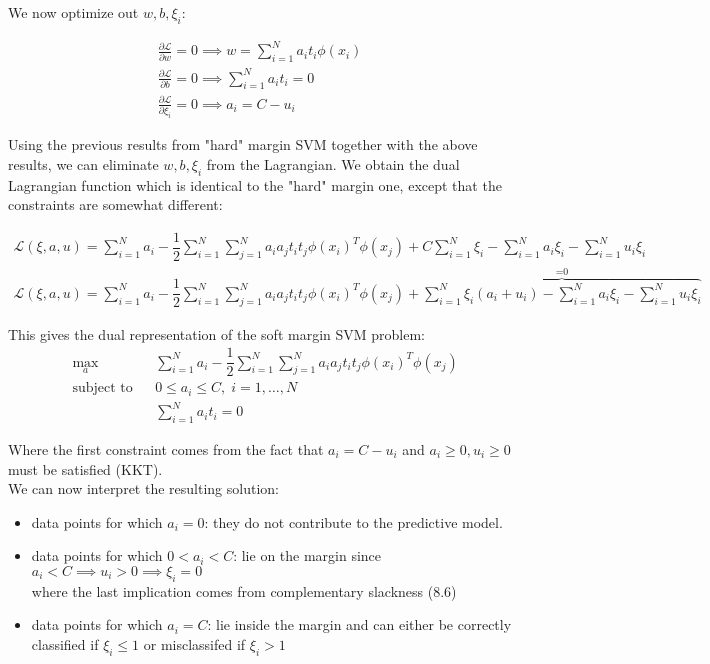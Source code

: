 \documentclass[twoside]{article}
\begin{document}
We now optimize out $w,b,\xi_{i}$:

\begin{align*}
        \frac{\partial{\mathcal{L}}}{\partial{w}} = 0 \implies w = \sum_{i=1}^{N} a_{i}t_{i}\phi(x_{i}) \\       \frac{\partial{\mathcal{L}}}{\partial{b}} = 0 \implies \sum_{i=1}^{N} a_{i}t_{i} = 0 \\
        \frac{\partial{\mathcal{L}}}{\partial{\xi_{i}}} = 0 \implies 
        a_{i} = C - u_{i}
\end{align*}

Using the previous results from "hard" margin SVM together with the above  results, we can  eliminate $w,b,\xi_{i}$ from the Lagrangian. We obtain the dual Lagrangian function which is identical to the "hard" margin one, except that the constraints are somewhat different:


\begin{align*}
         \mathcal{L}(\xi,a,u) = \sum_{i=1}^{N} a_{i}  - \dfrac{1}{2}
    \sum_{i=1}^{N} { \sum_{j=1}^{N} a_{i} a_{j} t_{i} t_{j} \phi(x_{i})^T \phi(x_{j})} + C \sum_{i=1}^{N} \xi_{i} - \sum_{i=1}^{N} a_{i} \xi_{i} -
         \sum_{i=1}^{N} u_{i} \xi_{i} \\       
          \mathcal{L}(\xi,a,u) = \sum_{i=1}^{N} a_{i}  - \dfrac{1}{2}
    \sum_{i=1}^{N} { \sum_{j=1}^{N} a_{i} a_{j} t_{i} t_{j} \phi(x_{i})^T \phi(x_{j})} +  \overbrace{\sum_{i=1}^{N} \xi_{i} (a_{i} + u_{i}) - \sum_{i=1}^{N} a_{i} \xi_{i} -
         \sum_{i=1}^{N} u_{i} \xi_{i}}^\text{=0} 
        \end{align*}

This gives the dual representation of the soft margin SVM problem:
\begin{equation*}
\begin{aligned}
& \underset{a}{\text{max}}
& & \sum_{i=1}^{N} a_{i}  - \dfrac{1}{2}
    \sum_{i=1}^{N} { \sum_{j=1}^{N} a_{i} a_{j} t_{i} t_{j} \phi(x_{i})^T \phi(x_{j})}\\
& \text{subject to}
& & 0 \leq a_{i} \leq C  , \; i = 1, \ldots, N \\
&&& \sum_{i=1}^{N} a_{i}t_{i} = 0
\end{aligned}
\end{equation*}

Where the first constraint comes from the fact that $a_{i} = C - u_{i}$ and $a_{i} \geq 0, u_{i} \geq 0$ must be satisfied (KKT).
\\

We can now interpret the resulting solution:
\begin{itemize}
    \item data points for which $a_{i} = 0$: they do not contribute to the predictive model.
    \item data points for which $0 < a_{i} < C$: lie on the margin since $a_{i} < C \implies u_{i} > 0 \implies \xi_{i} = 0$  \\ where the last implication comes from complementary slackness (8.6)
    \item data points for which $a_{i} = C$: lie inside the margin and can either be correctly classified if $\xi_{i} \leq 1$ or misclassifed if $\xi_{i} > 1$
\end{itemize}
\newpage
\end{document}
